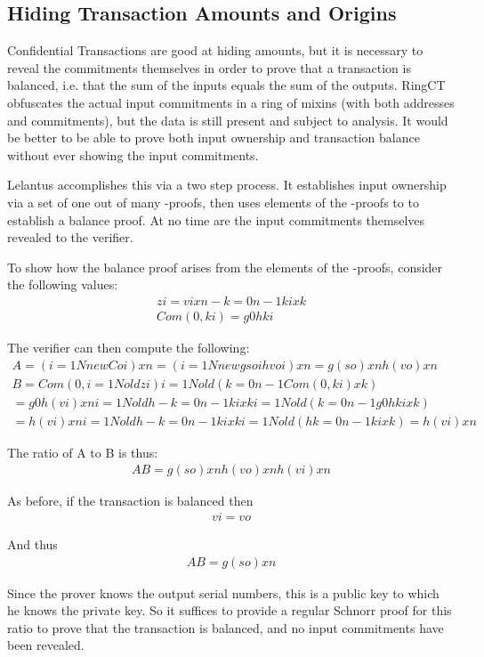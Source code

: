 \documentclass{article}
\begin{document}
\subsection{Hiding Transaction Amounts and Origins}
 
Confidential Transactions are good at hiding amounts, but it is necessary to reveal the commitments themselves in order to prove that a transaction is balanced, i.e. that the sum of the inputs equals the sum of the outputs.  RingCT obfuscates the actual input commitments in a ring of mixins (with both addresses and commitments), but the data is still present and subject to analysis.  It would be better to be able to prove both input ownership and transaction balance without ever showing the input commitments.

Lelantus accomplishes this via a two step process.  It establishes input ownership via a set of one out of many -proofs, then uses elements of the -proofs to to establish a balance proof.  At no time are the input commitments themselves revealed to the verifier.

To show how the balance proof arises from the elements of the -proofs, consider the following values:
\begin{align}
  zi=vixn-k=0n-1kixk\\
  Com(0,ki)=g0hki
\end{align}

The verifier can then compute the following:
\begin{align}
  A=(i=1NnewCoi)xn=(i=1Nnewgsoihvoi)xn=g( so) xnh( vo) xn\\
  B=Com(0,i=1Noldzi) i=1Nold(k=0n-1Com(0,ki)xk)\\
  =g0h( vi) xn i=1Noldh-k=0n-1kixki=1Nold(k=0n-1g0hkixk)\\
  =h( vi) xn i=1Noldh-k=0n-1kixki=1Nold(hk=0n-1kixk)=h( vi) xn
\end{align}

The ratio of A to B is thus:
\begin{align}
  AB=g( so) xnh( vo) xnh( vi) xn
\end{align}
  
As before, if the transaction is balanced then 
\begin{align}
  vi= vo
\end{align}

And thus
\begin{align}
  AB=g( so) xn
\end{align}

Since the prover knows the output serial numbers, this is a public key to which he knows the private key.  So it suffices to provide a regular Schnorr proof for this ratio to prove that the transaction is balanced, and no input commitments have been revealed.
\end{document}
